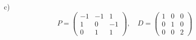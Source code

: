{\begin{enumerate}
        A vector that is a basis for the eigenspace is $$v_3 = \begin{pmatrix} 1\\-1\\1\end{pmatrix}$$ But any non-zero multiple of this vector is also ok. 
        \item[c)] $$P = \begin{pmatrix} -1&-1&1\\1&0&-1\\0&1&1\end{pmatrix}, \quad D = \begin{pmatrix} 1&0&0\\0&1&0\\0&0&2\end{pmatrix}$$
    \end{enumerate}
    } 
   \fi
\fi 